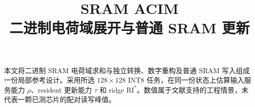 \documentclass[11pt,a4paper,fontset=fandol]{ctexart}
\title{\bfseries SRAM ACIM\\[4pt]\large 二进制电荷域展开与普通 SRAM 更新}
\author{}\date{}
\begin{document}
\maketitle\vspace{-1.7em}
\noindent 本文将二进制 SRAM 电荷域求和与独立转换、数字重构及普通 SRAM 写入组成一份局部参考设计。采用所选 $128\times128$ INT8 任务，在同一份状态上估算输入服务能力 $\rho$、resident 更新能力 $\tau$ 和 ridge $\mathrm{RI}^{*}$。数值属于文献支持的工程情景，未代表一颗已测芯片的配对读写峰值。


\end{document}
